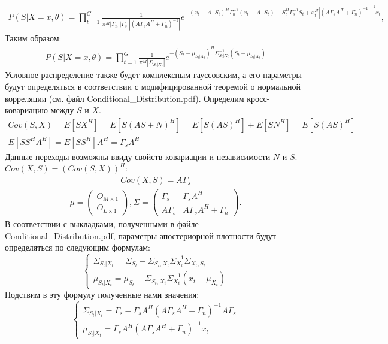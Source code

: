 \documentclass[11pt]{article}
\begin{document}
\begin{gather}
P(S|X=x,\theta) = \prod_{t=1}^G \frac{1}{\pi^M |\Gamma_n||\Gamma_s||(A\Gamma_s A^H + \Gamma_n)^{-1}|}e^{-(x_t-A\cdot S_t)^H \Gamma_n^{-1}(x_t-A\cdot S_t)-S_t^H\Gamma_s^{-1}S_t+x_t^H |(A\Gamma_s A^H + \Gamma_n)^{-1}|^{-1}x_t},
\end{gather}
Таким образом:
\begin{gather}
P(S|X=x,\theta) = \prod_{t=1}^G \frac{1}{\pi^M |\Sigma_{S_t|X_t}|}e^{-(S_t-\mu_{S_t|X_t})^H \Sigma_{S_t|X_t}^{-1} (S_t-\mu_{S_t|X_t})}
\end{gather}
Условное распределение также будет комплексным гауссовским, а его параметры будут определяться в соответствии с модифицированной теоремой о нормальной корреляции (см. файл Conditional\_Distribution.pdf).
Определим кросс-ковариацию между $S$ и $X$.
\begin{equation}
\begin{gathered}
Cov(S,X)=E[SX^H]=E[S(AS+N)^H]=E[S(AS)^H]+E[SN^H]=E[S(AS)^H]=\\E[SS^HA^H]=E[SS^H]A^H=\Gamma_sA^H
\end{gathered}
\end{equation}
Данные переходы возможны ввиду свойств ковариации и независимости $N$ и $S$. $Cov(X,S)=(Cov(S,X))^H$:
\begin{gather}
Cov(X,S) = A\Gamma_s
\end{gather}
\begin{gather}
\mu = \begin{pmatrix}
O_{M\times1}\\
O_{L\times1}
\end{pmatrix},
\Sigma = \begin{pmatrix}
\Gamma_s&\Gamma_sA^H\\
A\Gamma_s&A\Gamma_sA^H+\Gamma_n
\end{pmatrix}.
\end{gather}
В соответствии с выкладками, полученными в файле  Conditional\_Distribution.pdf, параметры апостериорной плотности будут определяться по следующим формулам:
\begin{equation}
\left\{ \begin{gathered} 
\Sigma_{S_t|X_t} = \Sigma_{S_t}-\Sigma_{S_t,X_t}\Sigma_{X_t}^{-1}\Sigma_{X_t,S_t} \\
\mu_{S_t|X_t} = \mu_{S_t} + \Sigma_{S_t,X_t}\Sigma_{X_t}^{-1}(x_t-\mu_{X_t})
\end{gathered} \right.
\end{equation}
Подствим в эту формулу полученные нами значения:
\begin{equation}
\left\{ \begin{gathered} 
\Sigma_{S_t|X_t} = \Gamma_s-\Gamma_sA^H(A\Gamma_sA^H+\Gamma_n)^{-1}A\Gamma_s \\
\mu_{S_t|X_t} = \Gamma_sA^H(A\Gamma_sA^H+\Gamma_n)^{-1} x_t
\end{gathered} \right.
\end{equation}
\end{document}
